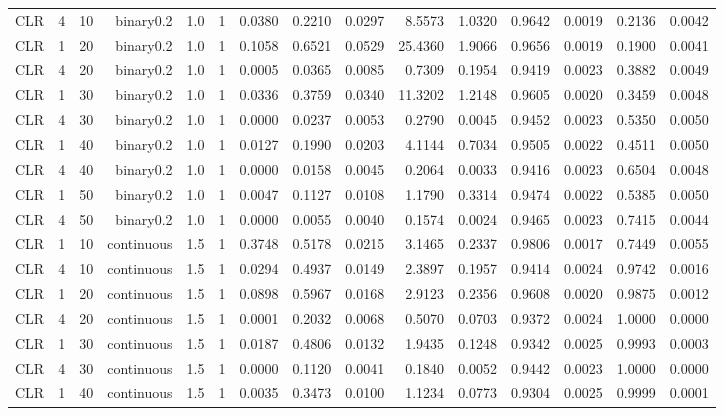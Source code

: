\begin{longtable}{rrrrrrrrrrrrrrr}
  CLR & 4 & 10 & binary0.2 & 1.0 & 1 & 0.0380 & 0.2210 & 0.0297 & 8.5573 & 1.0320 & 0.9642 & 0.0019 & 0.2136 & 0.0042 \\ 
  CLR & 1 & 20 & binary0.2 & 1.0 & 1 & 0.1058 & 0.6521 & 0.0529 & 25.4360 & 1.9066 & 0.9656 & 0.0019 & 0.1900 & 0.0041 \\ 
  CLR & 4 & 20 & binary0.2 & 1.0 & 1 & 0.0005 & 0.0365 & 0.0085 & 0.7309 & 0.1954 & 0.9419 & 0.0023 & 0.3882 & 0.0049 \\ 
  CLR & 1 & 30 & binary0.2 & 1.0 & 1 & 0.0336 & 0.3759 & 0.0340 & 11.3202 & 1.2148 & 0.9605 & 0.0020 & 0.3459 & 0.0048 \\ 
  CLR & 4 & 30 & binary0.2 & 1.0 & 1 & 0.0000 & 0.0237 & 0.0053 & 0.2790 & 0.0045 & 0.9452 & 0.0023 & 0.5350 & 0.0050 \\ 
  CLR & 1 & 40 & binary0.2 & 1.0 & 1 & 0.0127 & 0.1990 & 0.0203 & 4.1144 & 0.7034 & 0.9505 & 0.0022 & 0.4511 & 0.0050 \\ 
  CLR & 4 & 40 & binary0.2 & 1.0 & 1 & 0.0000 & 0.0158 & 0.0045 & 0.2064 & 0.0033 & 0.9416 & 0.0023 & 0.6504 & 0.0048 \\ 
  CLR & 1 & 50 & binary0.2 & 1.0 & 1 & 0.0047 & 0.1127 & 0.0108 & 1.1790 & 0.3314 & 0.9474 & 0.0022 & 0.5385 & 0.0050 \\ 
  CLR & 4 & 50 & binary0.2 & 1.0 & 1 & 0.0000 & 0.0055 & 0.0040 & 0.1574 & 0.0024 & 0.9465 & 0.0023 & 0.7415 & 0.0044 \\ 
  CLR & 1 & 10 & continuous & 1.5 & 1 & 0.3748 & 0.5178 & 0.0215 & 3.1465 & 0.2337 & 0.9806 & 0.0017 & 0.7449 & 0.0055 \\ 
  CLR & 4 & 10 & continuous & 1.5 & 1 & 0.0294 & 0.4937 & 0.0149 & 2.3897 & 0.1957 & 0.9414 & 0.0024 & 0.9742 & 0.0016 \\ 
  CLR & 1 & 20 & continuous & 1.5 & 1 & 0.0898 & 0.5967 & 0.0168 & 2.9123 & 0.2356 & 0.9608 & 0.0020 & 0.9875 & 0.0012 \\ 
  CLR & 4 & 20 & continuous & 1.5 & 1 & 0.0001 & 0.2032 & 0.0068 & 0.5070 & 0.0703 & 0.9372 & 0.0024 & 1.0000 & 0.0000 \\ 
  CLR & 1 & 30 & continuous & 1.5 & 1 & 0.0187 & 0.4806 & 0.0132 & 1.9435 & 0.1248 & 0.9342 & 0.0025 & 0.9993 & 0.0003 \\ 
  CLR & 4 & 30 & continuous & 1.5 & 1 & 0.0000 & 0.1120 & 0.0041 & 0.1840 & 0.0052 & 0.9442 & 0.0023 & 1.0000 & 0.0000 \\ 
  CLR & 1 & 40 & continuous & 1.5 & 1 & 0.0035 & 0.3473 & 0.0100 & 1.1234 & 0.0773 & 0.9304 & 0.0025 & 0.9999 & 0.0001 \\ 

\end{longtable}
